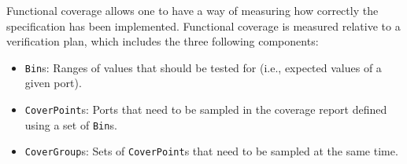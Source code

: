 \documentclass[conference]{IEEEtran}
\begin{document}
%
%
%

Functional coverage allows one to have a way of measuring how correctly the specification has been implemented. Functional coverage is measured relative to a verification plan, which includes the three following components:

\begin{itemize}
  \item \texttt{Bin}s: Ranges of values that should be tested for (i.e., expected values of a given port).
  \item \texttt{CoverPoint}s: Ports that need to be sampled in the coverage report defined using a set of \texttt{Bin}s.
  \item \texttt{CoverGroup}s: Sets of \texttt{CoverPoint}s that need to be sampled at the same time.
\end{itemize}
\end{document}
